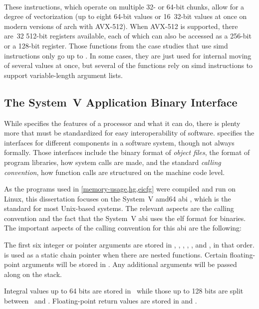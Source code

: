 \paragraph{}
These instructions, which operate on multiple 32- or 64-bit chunks,
allow for a degree of vectorization (up to eight 64-bit values
or 16~32-bit values at once on modern versions of \gls{arch} with AVX-512).
When AVX-512 is supported, there are~32 512-bit  registers available,
each of which can also be accessed as a 256-bit 
or a 128-bit  register.
Those functions from the case studies that use \gls{simd} instructions
only go up to . In some cases, they are just used for internal moving
of several values at once, but several of the functions rely on \gls{simd} instructions
to support variable-length argument lists.

\subsection{The System~V  Application Binary Interface}
While  specifies the features of a processor and what it can do,
there is plenty more that must be standardized for easy interoperability of
software.  specifies the interfaces for different components
in a software system, though not always formally. Those interfaces include
the binary format of \emph{object files}, the format of program libraries,
how system calls are made, and the standard \emph{calling convention},
how function calls are structured on the machine code level.

As the programs used in \cref{memory-usage,hg,eicfg} were compiled and run on Linux,
this dissertation focuses on the System~V \gls{amd64} \gls{abi} \autocite{systemv-ABI-git},
which is the standard for most Unix-based systems.
The relevant aspects are the calling convention and the fact that the System~V \gls{abi} uses the \gls{elf} format for binaries.
The important aspects of the calling convention for this \gls{abi}
are the following:

The first six integer or pointer arguments are stored in \rdi,
\rsi, \rdx, \rcx, ,
and , in that order.
 is used as a static chain pointer when there are nested functions.
Certain floating-point arguments will be stored in
. Any additional arguments will be passed along on the stack.

Integral values up to 64 bits are stored in \rax\ while those up to 128 bits
are split between \rax\ and \rdx.
Floating-point return values are stored in  and .

